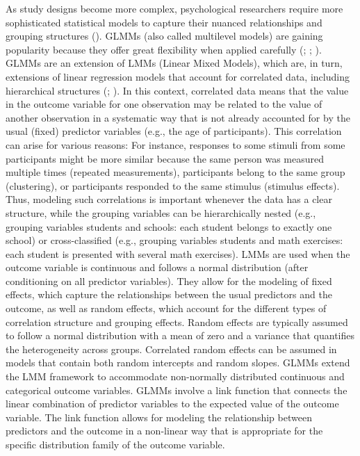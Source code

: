 \documentclass[
  man,
  floatsintext,
  longtable,
  a4paper,
  nolmodern,
  notxfonts,
  notimes,
  colorlinks=true,linkcolor=blue,citecolor=blue,urlcolor=blue]{apa7}
\begin{document}
As study designs become more complex, psychological researchers require
more sophisticated statistical models to capture their nuanced
relationships and grouping structures
(). GLMMs
(also called multilevel models) are gaining popularity because they
offer great flexibility when applied carefully
(;
;
). GLMMs are an extension of LMMs (Linear Mixed Models), which are,
in turn, extensions of linear regression models that account for
correlated data, including hierarchical structures
(;
). In this context, correlated data means that the value in the
outcome variable for one observation may be related to the value of
another observation in a systematic way that is not already accounted
for by the usual (fixed) predictor variables (e.g., the age of
participants). This correlation can arise for various reasons: For
instance, responses to some stimuli from some participants might be more
similar because the same person was measured multiple times (repeated
measurements), participants belong to the same group (clustering), or
participants responded to the same stimulus (stimulus effects). Thus,
modeling such correlations is important whenever the data has a clear
structure, while the grouping variables can be hierarchically nested
(e.g., grouping variables students and schools: each student belongs to
exactly one school) or cross-classified (e.g., grouping variables
students and math exercises: each student is presented with several math
exercises). LMMs are used when the outcome variable is continuous and
follows a normal distribution (after conditioning on all predictor
variables). They allow for the modeling of fixed effects, which capture
the relationships between the usual predictors and the outcome, as well
as random effects, which account for the different types of correlation
structure and grouping effects. Random effects are typically assumed to
follow a normal distribution with a mean of zero and a variance that
quantifies the heterogeneity across groups. Correlated random effects
can be assumed in models that contain both random intercepts and random
slopes. GLMMs extend the LMM framework to accommodate non-normally
distributed continuous and categorical outcome variables. GLMMs involve
a link function that connects the linear combination of predictor
variables to the expected value of the outcome variable. The link
function allows for modeling the relationship between predictors and the
outcome in a non-linear way that is appropriate for the specific
distribution family of the outcome variable.
\end{document}
